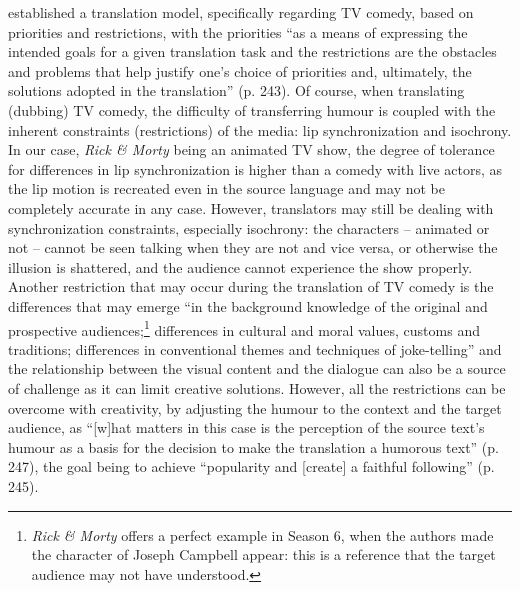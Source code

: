 \documentclass[output=paper]{langscibook}
\begin{document}
\citet{Zabalbeascoa1996} established a translation model, specifically regarding TV comedy, based on priorities and restrictions, with the priorities “as a means of expressing the intended goals for a given translation task and the restrictions are the obstacles and problems that help justify one’s choice of priorities and, ultimately, the solutions adopted in the translation” (p. 243). Of course, when translating (dubbing) TV comedy, the difficulty of transferring humour is coupled with the inherent constraints (restrictions) of the media: lip synchronization and isochrony. In our case, \textit{Rick \& Morty} being an animated TV show, the degree of tolerance for differences in lip synchronization is higher than a comedy with live actors, as the lip motion is recreated even in the source language and may not be completely accurate in any case. However, translators may still be dealing with synchronization constraints, especially isochrony: the characters – animated or not – cannot be seen talking when they are not and vice versa, or otherwise the illusion is shattered, and the audience cannot experience the show properly. Another restriction that may occur during the translation of TV comedy is the differences that may emerge “in the background knowledge of the original and prospective audiences;\footnote{\textit{Rick \& Morty} offers a perfect example in Season 6, when the authors made the character of Joseph Campbell appear: this is a reference that the target audience may not have understood.} differences in cultural and moral values, customs and traditions; differences in conventional themes and techniques of joke-telling” \citep[248]{Zabalbeascoa1996} and the relationship between the visual content and the dialogue can also be a source of challenge as it can limit creative solutions. However, all the restrictions can be overcome with creativity, by adjusting the humour to the context and the target audience, as “[w]hat matters in this case is the perception of the source text’s humour as a basis for the decision to make the translation a humorous text” (p. 247), the goal being to achieve “popularity and [create] a faithful following” (p. 245).
\end{document}
